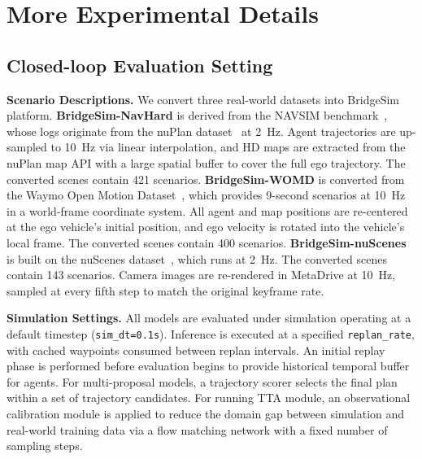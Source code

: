 \documentclass{article}
\begin{document}
\section{More Experimental Details}

\subsection{Closed-loop Evaluation Setting}
\label{appendix:cl_eval_details}
\textbf{Scenario Descriptions.} We convert three real-world datasets into BridgeSim platform. \textbf{BridgeSim-NavHard} is derived from the NAVSIM benchmark~\cite{navsimv1}, whose logs originate from the nuPlan dataset~\cite{caesar2021nuplan} at 2~Hz. Agent trajectories are up-sampled to 10~Hz via linear interpolation, and HD maps are extracted from the nuPlan map API with a large spatial buffer to cover the full ego trajectory. The converted scenes contain 421 scenarios. \textbf{BridgeSim-WOMD} is converted from the Waymo Open Motion Dataset~\cite{ettinger2021large}, which provides 9-second scenarios at 10~Hz in a world-frame coordinate system. All agent and map positions are re-centered at the ego vehicle's initial position, and ego velocity is rotated into the vehicle's local frame. The converted scenes contain 400 scenarios. \textbf{BridgeSim-nuScenes} is built on the nuScenes dataset~\cite{caesar2020nuscenes}, which runs at 2~Hz. The converted scenes contain 143 scenarios. Camera images are re-rendered in MetaDrive at 10~Hz, sampled at every fifth step to match the original keyframe rate.

\noindent \textbf{Simulation Settings.} All models are evaluated under simulation operating at a default timestep (\texttt{sim\_dt=0.1s}). Inference is executed at a specified \texttt{replan\_rate}, with cached waypoints consumed between replan intervals. An initial replay phase is performed before evaluation begins to provide historical temporal buffer for agents. For multi-proposal models, a trajectory scorer selects the final plan within a set of trajectory candidates. For running TTA module, an observational calibration module is applied to reduce the domain gap between simulation and real-world training data via a flow matching network with a fixed number of sampling steps.
\end{document}
